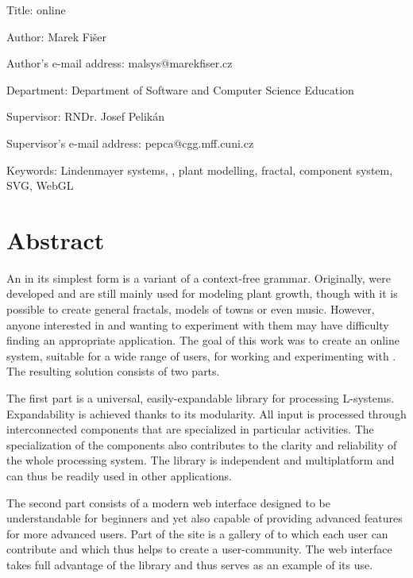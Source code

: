 \clearpage
{%
\setlength\parindent{0mm}%
\setlength\parskip{5mm}%
Title: \lsystems online

Author: Marek Fišer

Author's e-mail address: malsys@marekfiser.cz

Department: Department of Software and Computer Science Education

Supervisor: RNDr. Josef Pelikán

Supervisor's e-mail address: pepca@cgg.mff.cuni.cz

Keywords: Lindenmayer systems, \lsystems, plant modelling, fractal, component system, SVG, WebGL

\section*{Abstract}
}
An \lsystem in its simplest form is a variant of a context-free grammar.
Originally, \lsystems were developed and are still mainly used for modeling plant growth, though with \lsystems it is possible to create general fractals, models of towns or even music.
However, anyone interested in \lsystems and wanting to experiment with them may have difficulty finding an appropriate application.
The goal of this work was to create an online system, suitable for a wide range of users, for working and experimenting with \lsystems.
The resulting solution consists of two parts.

The first part is a universal, easily-expandable library for processing \mbox{L-sys}\-tems.
Expandability is achieved thanks to its modularity.
All input is processed through interconnected components that are specialized in particular activities.
The specialization of the components also contributes to the clarity and reliability of the whole processing system.
The library is independent and multiplatform and can thus be readily used in other applications.

The second part consists of a modern web interface designed to be understandable for beginners and yet also capable of providing advanced features for more advanced users.
Part of the site is a gallery of \lsystems to which each user can contribute and which thus helps to create a user-community.
The web interface takes full advantage of the library and thus serves as an example of its use.




































